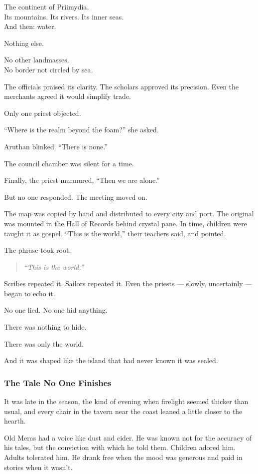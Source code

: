 \documentclass[12pt]{article}
\begin{document}
The continent of Priimydia.\\
Its mountains. Its rivers. Its inner seas.\\
And then: water.

Nothing else.

No other landmasses.\\
No border not circled by sea.

The officials praised its clarity. The scholars approved its precision. Even the merchants agreed it would simplify trade.

Only one priest objected.

``Where is the realm beyond the foam?'' she asked.

Aruthan blinked. ``There is none.''

The council chamber was silent for a time.

Finally, the priest murmured, ``Then we are alone.''

But no one responded. The meeting moved on.

The map was copied by hand and distributed to every city and port. The original was mounted in the Hall of Records behind crystal pane. In time, children were taught it as gospel. ``This is the world,'' their teachers said, and pointed.

The phrase took root.

\begin{quote}
\emph{``This is the world.''}
\end{quote}

Scribes repeated it. Sailors repeated it. Even the priests — slowly, uncertainly — began to echo it.

No one lied. No one hid anything.

There was nothing to hide.

There was only the world.

And it was shaped like the island that had never known it was sealed.


\dotfill

\subsubsection{The Tale No One Finishes}

It was late in the season, the kind of evening when firelight seemed thicker than usual, and every chair in the tavern near the coast leaned a little closer to the hearth.

Old Meras had a voice like dust and cider. He was known not for the accuracy of his tales, but the conviction with which he told them. Children adored him. Adults tolerated him. He drank free when the mood was generous and paid in stories when it wasn’t.
\end{document}
